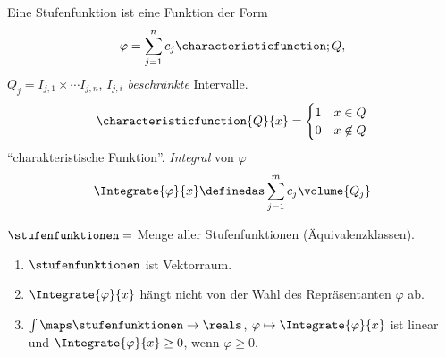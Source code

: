 \begin{definition}\label{stufen_mit_integral}
  Eine Stufenfunktion ist eine Funktion der Form
  \begin{equation*}
    \varphi=\sum_{j=1}^{n}c_j \characteristicfunction;{Q},
  \end{equation*}
  \( Q_j=I_{j,1}\times\dotsb I_{j,n} \), \( I_{j,i} \) \emph{beschränkte} Intervalle.
  \begin{equation*}
    \characteristicfunction{Q}{x}=\begin{cases}
      1&x\in Q\\
      0& x\not\in Q
    \end{cases}
  \end{equation*}
  \enquote{charakteristische Funktion}. \emph{Integral} von \( \varphi \)
  \begin{equation*}
    \Integrate{\varphi}{x}\definedas \sum_{j=1}^{m}c_j \volume{Q_j}
  \end{equation*}
\end{definition}
\begin{lemma}
  \( \stufenfunktionen= \) Menge aller Stufenfunktionen (\bzw Äquivalenzklassen).
  \begin{enumerate}
    \item \( \stufenfunktionen \) ist Vektorraum.
    \item \label{integral_aequivalente_stufenfunktionen_gleich}\( \Integrate{\varphi}{x} \) hängt nicht von der Wahl des Repräsentanten \( \varphi \) ab.
    \item \( \int\maps \stufenfunktionen \to \reals \), \( \varphi\mapsto \Integrate{\varphi}{x} \) ist linear und \( \Integrate{\varphi}{x}\geq 0 \), wenn \( \varphi\geq 0 \).
  \end{enumerate}
\end{lemma}
